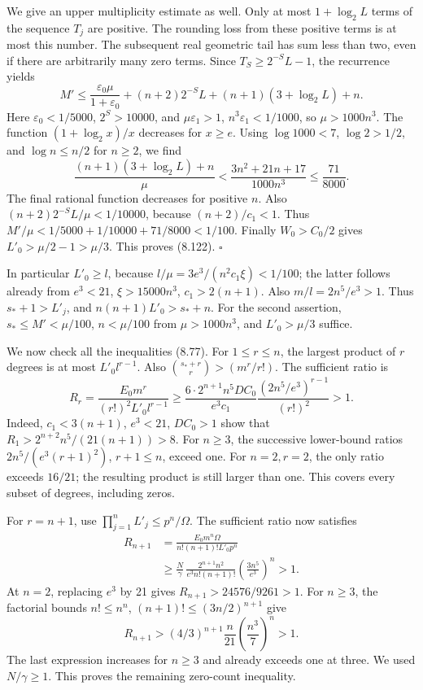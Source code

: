 \documentclass[
  11pt,
  a4paper,
]{article}
\begin{document}
We give an upper multiplicity estimate as well. Only at most
\(1+\log_2L\) terms of the sequence \(T_j\) are positive. The rounding
loss from these positive terms is at most this number. The subsequent
real geometric tail has sum less than two, even if there are arbitrarily
many zero terms. Since \(T_S\ge2^{-S}L-1\), the recurrence yields \[
M'\le
\frac{\varepsilon_0\mu}{1+\varepsilon_0}
+(n+2)2^{-S}L+(n+1)(3+\log_2L)+n.
\] Here \(\varepsilon_0<1/5000\), \(2^S>10000\), and
\(\mu\varepsilon_1>1\), \(n^3\varepsilon_1<1/1000\), so \(\mu>1000n^3\).
The function \((1+\log_2x)/x\) decreases for \(x\ge e\). Using
\(\log1000<7\), \(\log2>1/2\), and \(\log n\le n/2\) for \(n\ge2\), we
find \[
\frac{(n+1)(3+\log_2L)+n}{\mu}
<
\frac{3n^2+21n+17}{1000n^3}
\le\frac{71}{8000}.
\] The final rational function decreases for positive \(n\). Also
\((n+2)2^{-S}L/\mu<1/10000\), because \((n+2)/c_1<1\). Thus
\(M'/\mu<1/5000+1/10000+71/8000<1/100\). Finally \(W_0>C_0/2\) gives
\(L'_0>\mu/2-1>\mu/3\). This proves (8.122). \(\square\)

In particular \(L'_0\ge l\), because \(l/\mu=3e^3/(n^2c_1\xi)<1/100\);
the latter follows already from \(e^3<21\), \(\xi>15000n^3\),
\(c_1>2(n+1)\). Also \(m/l=2n^5/e^3>1\). Thus \(s_*+1>L'_j\), and
\(n(n+1)L'_0>s_*+n\). For the second assertion, \(s_*\le M'<\mu/100\),
\(n<\mu/100\) from \(\mu>1000n^3\), and \(L'_0>\mu/3\) suffice.

We now check all the inequalities (8.77). For \(1\le r\le n\), the
largest product of \(r\) degrees is at most \(L'_0l^{r-1}\). Also
\(\binom{s_*+r}{r}>(m^r/r!)\). The sufficient ratio is \[
R_r=
\frac{E_0m^r}{(r!)^2L'_0l^{r-1}}
\ge
\frac{6\cdot2^{n+1}n^5DC_0}{e^3c_1}
\frac{(2n^5/e^3)^{r-1}}{(r!)^2}>1.
\tag{8.123}
\] Indeed, \(c_1<3(n+1)\), \(e^3<21\), \(DC_0>1\) show that
\(R_1>2^{n+2}n^5/(21(n+1))>8\). For \(n\ge3\), the successive
lower-bound ratios \(2n^5/(e^3(r+1)^2)\), \(r+1\le n\), exceed one. For
\(n=2,r=2\), the only ratio exceeds \(16/21\); the resulting product is
still larger than one. This covers every subset of degrees, including
zeros.

For \(r=n+1\), use \(\prod_{j=1}^nL'_j\le p^n/\Omega\). The sufficient
ratio now satisfies \[
\begin{aligned}
R_{n+1}
&=\frac{E_0m^n\Omega}{n!(n+1)!L'_0p^n}\\
&\ge
\frac N\gamma\,
\frac{2^{n+1}n^2}{e^3n!(n+1)!}
\left(\frac{3n^5}{e^3}\right)^n>1.
\end{aligned}
\tag{8.124}
\] At \(n=2\), replacing \(e^3\) by 21 gives \(R_{n+1}>24576/9261>1\).
For \(n\ge3\), the factorial bounds \(n!\le n^n\),
\((n+1)!\le(3n/2)^{n+1}\) give \[
R_{n+1}>
(4/3)^{n+1}\frac n{21}\left(\frac{n^3}{7}\right)^n>1.
\] The last expression increases for \(n\ge3\) and already exceeds one
at three. We used \(N/\gamma\ge1\). This proves the remaining zero-count
inequality.
\end{document}
